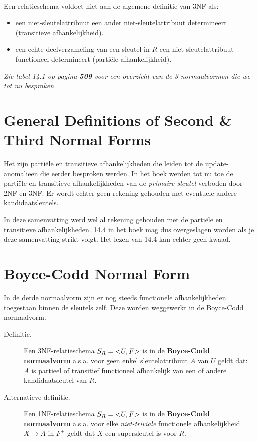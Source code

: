 ~

\noindent Een relatieschema voldoet niet aan de algemene definitie van 3NF als:				
\begin{itemize}
	\item een niet-sleutelattribuut een ander niet-sleutelattribuut determineert (transitieve afhankelijkheid).
	\item een echte deelverzameling van een sleutel in $R$ een niet-sleutelattribuut functioneel determineert (parti\"ele afhankelijkheid).
\end{itemize}
\textit{Zie tabel 14.1 op pagina \textbf{509} voor een overzicht van de 3 normaalvormen die we tot nu bespraken.}



\section{General Definitions of Second \& Third Normal Forms}
Het zijn parti\"ele en transitieve afhankelijkheden die leiden tot de update-anomalie\"en die eerder besproken werden. In het boek werden tot nu toe de parti\"ele en transitieve afhankelijkheden van de \textit{primaire sleutel} verboden door 2NF en 3NF. Er wordt echter geen rekening gehouden met eventuele andere kandidaatsleutels.

In deze samenvatting werd wel al rekening gehouden met de parti\"ele en transitieve afhankelijkheden. 14.4 in het boek mag dus overgeslagen worden als je deze samenvatting strikt volgt. Het lezen van 14.4 kan echter geen kwaad.


\section{Boyce-Codd Normal Form}
In de derde normaalvorm zijn er nog steeds functionele afhankelijkheden toegestaan binnen de sleutels zelf. Deze worden weggewerkt in de Boyce-Codd normaalvorm.

\begin{description}
\item[Definitie. ] Een 3NF-relatieschema $S_R = \text{\textless} U,F \text{\textgreater}$ is in de \textbf{Boyce-Codd normaalvorm} a.s.a. voor geen enkel sleutelattribuut $A$ van $U$ geldt dat:\\
$A$ is partieel of transitief functioneel afhankelijk van een of andere kandidaatsleutel van $R$.

\item[Alternatieve definitie. ] Een 1NF-relatieschema $S_R = \text{\textless} U,F \text{\textgreater}$ is in de \textbf{Boyce-Codd normaalvorm} a.s.a. voor elke \textit{niet-triviale} functionele afhankelijkheid $X \rightarrow A$ in $F^+$ geldt dat $X$ een supersleutel is voor $R$.
\end{description}

